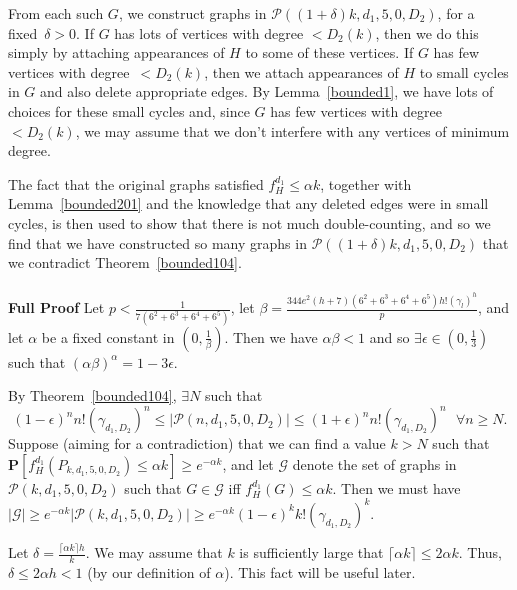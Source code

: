 \documentclass{article}
\newtheorem{Proof of Theorem}{Proof of Theorem}
\begin{document}
From each such $G$,
we construct graphs in $\mathcal{P}((1+\delta)k,d_{1},5,0,D_{2})$, for a fixed~$\delta >0$.
If $G$ has lots of vertices with degree $<D_{2}(k)$,
then we do this simply by attaching appearances of $H$ to some of these vertices.
If $G$ has few vertices with degree~$<D_{2}(k)$,
then we attach appearances of $H$ to small cycles in $G$ 
and also delete appropriate edges.
By Lemma~\ref{bounded1},
we have lots of choices for these small cycles
and, since $G$ has few vertices with degree $<D_{2}(k)$,
we may assume that we don't interfere with any vertices of minimum degree.

The fact that the original graphs satisfied $f_{H}^{d_{1}} \leq \alpha k$,
together with Lemma~\ref{bounded201} and the knowledge that any deleted edges were in small cycles,
is then used to show that there is not much double-counting,
and so we find that we have constructed so many graphs in $\mathcal{P}((1+\delta)k,d_{1},5,0,D_{2})$
that we contradict Theorem~\ref{bounded104}. \\
\\
\textbf{Full Proof}
Let $p < \frac{1}{7(6^{2}+6^{3}+6^{4}+6^{5})}$,
let $\beta = \frac{344e^{2}(h+7)(6^{2}+6^{3}+6^{4}+6^{5})h! \left( \gamma_{l} \right)^{h}}{p}$,
and let $\alpha$ be a fixed constant in 
$\left( 0, \frac{1}{\beta} \right)$.
Then we have $\alpha \beta <1$ 
and so $\exists \epsilon \in \left( 0,\frac{1}{3} \right)$ such that $(\alpha \beta)^{\alpha} = 1-3 \epsilon$.

By Theorem~\ref{bounded104},
$\exists N$ such that
\begin{equation} \label{eq:gr}
(1-\epsilon)^{n}n! \left( \gamma_{d_{1},D_{2}} \right)^{n}
\leq |\mathcal{P}(n,d_{1},5,0,D_{2})|
\leq (1+\epsilon)^{n}n! \left( \gamma_{d_{1},D_{2}} \right)^{n} 
\textrm{ } \forall n \geq N.
\end{equation}
Suppose (aiming for a contradiction) 
that we can find a value
$k>N$ such that
$\mathbf{P} [ f_{H}^{d_{1}} (P_{k,d_{1},5,0,D_{2}}) \leq \alpha k ] \geq e^{-\alpha k}$,
and let $\mathcal{G}$ denote the set of graphs in $\mathcal{P}(k,d_{1},5,0,D_{2})$ such that
$G \in \mathcal{G}$ iff $f_{H}^{d_{1}} (G) \leq \alpha k$.
Then we must have 
$|\mathcal{G}| \geq e^{-\alpha k} |\mathcal{P}(k,d_{1},5,0,D_{2})| \geq 
e^{-\alpha k} (1-\epsilon)^{k}k! \left( \gamma_{d_{1},D_{2}} \right)^{k}$. 

Let $\delta = \frac{\lceil \alpha k \rceil h}{k}$.
We may assume that $k$ is sufficiently large that 
$\lceil \alpha k \rceil \leq 2 \alpha k$.
Thus, $\delta \leq 2 \alpha h < 1$ \label{delta}
(by our definition of $\alpha$).
This fact will be useful later. \\
\end{document}
